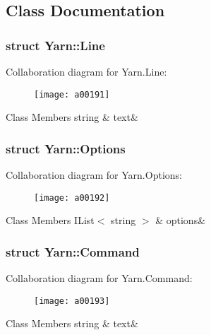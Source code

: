 \subsection{Class Documentation}
\label{a00180}
\hypertarget{a00040_a00180}{}
\subsubsection{struct Yarn\-:\-:Line}


Collaboration diagram for Yarn.\-Line\-:
\nopagebreak
\begin{figure}[H]
\begin{center}
\leavevmode
\texttt{[image: a00191]}
\end{center}
\end{figure}
\begin{DoxyFields}{Class Members}
\hypertarget{a00040_a81d1f04bbb4cf6642d2bd685bda1da20}{string}\label{a00040_a81d1f04bbb4cf6642d2bd685bda1da20}
&
text&
\\
\hline

\end{DoxyFields}
\label{a00182}
\hypertarget{a00040_a00182}{}
\subsubsection{struct Yarn\-:\-:Options}


Collaboration diagram for Yarn.\-Options\-:
\nopagebreak
\begin{figure}[H]
\begin{center}
\leavevmode
\texttt{[image: a00192]}
\end{center}
\end{figure}
\begin{DoxyFields}{Class Members}
\hypertarget{a00040_ae8c616d923ceeeed192a9436c55d9917}{I\-List$<$ string $>$}\label{a00040_ae8c616d923ceeeed192a9436c55d9917}
&
options&
\\
\hline

\end{DoxyFields}
\label{a00177}
\hypertarget{a00040_a00177}{}
\subsubsection{struct Yarn\-:\-:Command}


Collaboration diagram for Yarn.\-Command\-:
\nopagebreak
\begin{figure}[H]
\begin{center}
\leavevmode
\texttt{[image: a00193]}
\end{center}
\end{figure}
\begin{DoxyFields}{Class Members}
\hypertarget{a00040_a8564e5104566e145f5d917ec846444d9}{string}\label{a00040_a8564e5104566e145f5d917ec846444d9}
&
text&
\\
\hline

\end{DoxyFields}
